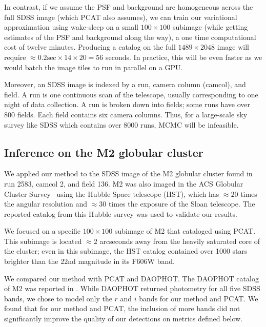 In contrast, if we assume the PSF and background are homogeneous 
across the full SDSS image (which PCAT also assumes), we can 
train our variational approximation using wake-sleep 
on a small $100 \times 100$ subimage
(while getting estimates of the PSF and background along the way),
a one time computational cost of twelve minutes. 
Producing a catalog on the full $1489 \times 2048$ image will require 
$\approx 0.2\text{sec} \times 14 \times 20 = 56$ seconds. In practice, 
this will be even faster as we would batch the image tiles to run in parallel on a GPU. 

Moreover, an SDSS image is indexed by a run, camera column (camcol), and field.
A run is one continuous scan of the telescope, usually corresponding to one night of data collection. 
A run is broken down into fields; some runs have over 800 fields. 
Each field contains six camera columns. 
Thus, for a large-scale sky survey like SDSS which 
contains over 8000 runs, MCMC will be infeasible. 


\subsection{Inference on the M2 globular cluster}
We applied our method to the SDSS image of the M2 globular cluster found in run 2583, camcol 2, and field 136.
M2 was also imaged in the ACS Globular Cluster Survey~\cite{Sarajedini_2007}
using the Hubble Space telescope (HST),
which has $\approx20$ times the angular resolution and $\approx30$ times the exposure of the Sloan telescope. The reported catalog from this Hubble survey was used to 
validate our results.

We focused on a specific $100 \times 100$ subimage of M2 that \cite{Portillo_2017, Feder_2019} cataloged using PCAT.
This subimage is located $\approx2$ arcseconds away from the heavily saturated core of the cluster;
even in this subimage, the HST catalog contained over 1000 stars brighter than the 22nd magnitude in its F606W band.

We compared our method with PCAT and DAOPHOT. The DAOPHOT catalog of M2 was reported in 
\cite{An_2008_m2}. While DAOPHOT returned photometry for all five SDSS bands, 
we chose to model only the $r$ and $i$ bands for our method and PCAT. We found that for our method and PCAT, the inclusion of more bands did not significantly improve
the quality of our detections on metrics defined below. 

